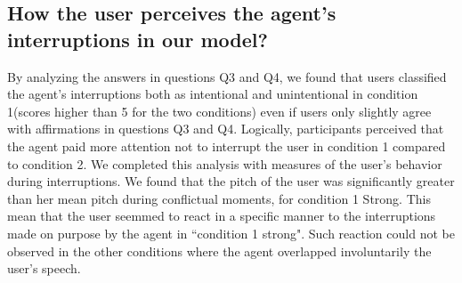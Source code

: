 \begin{table}
\centering
{}
\caption{Mean agreements of the participants for conditions 1 and condition 2 (translated from French).}
\label{Answers}
\end{table}

\subsection{How the user perceives the agent's interruptions in our model?}

By analyzing the answers in questions Q3 and Q4, we found that users classified the agent's interruptions both as intentional and unintentional in condition 1(scores higher than 5 for the two conditions) even if users only slightly agree with affirmations in questions Q3 and Q4. Logically, participants perceived that the agent paid more attention not to interrupt the user in condition 1 compared to condition 2. 
We completed this analysis with measures of the user's behavior during interruptions. We found that the pitch of the user was significantly greater than her mean pitch during conflictual moments, for condition 1 Strong. This mean that the user seemmed to react in a specific manner to the interruptions made on purpose by the agent in ``condition 1 strong". Such reaction could not be observed in the other conditions where the agent overlapped involuntarily the user's speech.


